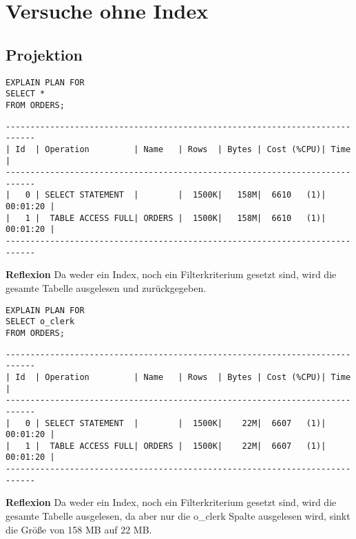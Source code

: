 \documentclass[10pt]{article}
\begin{document}
\section{Versuche ohne Index}
\subsection{Projektion}
\begin{lstlisting}[style=sql]
EXPLAIN PLAN FOR
SELECT *
FROM ORDERS;
\end{lstlisting}
\begin{lstlisting}[style=queryexecutionplan]
----------------------------------------------------------------------------
| Id  | Operation         | Name   | Rows  | Bytes | Cost (%CPU)| Time     |
----------------------------------------------------------------------------
|   0 | SELECT STATEMENT  |        |  1500K|   158M|  6610   (1)| 00:01:20 |
|   1 |  TABLE ACCESS FULL| ORDERS |  1500K|   158M|  6610   (1)| 00:01:20 |
----------------------------------------------------------------------------
\end{lstlisting}
\textbf{Reflexion} \newline
Da weder ein Index, noch ein Filterkriterium gesetzt sind, wird die gesamte Tabelle ausgelesen und zurückgegeben.
\newpage
\begin{lstlisting}[style=sql]
EXPLAIN PLAN FOR
SELECT o_clerk
FROM ORDERS;
\end{lstlisting}
\begin{lstlisting}[style=queryexecutionplan]
----------------------------------------------------------------------------
| Id  | Operation         | Name   | Rows  | Bytes | Cost (%CPU)| Time     |
----------------------------------------------------------------------------
|   0 | SELECT STATEMENT  |        |  1500K|    22M|  6607   (1)| 00:01:20 |
|   1 |  TABLE ACCESS FULL| ORDERS |  1500K|    22M|  6607   (1)| 00:01:20 |
----------------------------------------------------------------------------
\end{lstlisting}
\textbf{Reflexion} \newline
Da weder ein Index, noch ein Filterkriterium gesetzt sind, wird die gesamte Tabelle ausgelesen, da aber nur die o\_clerk Spalte ausgelesen wird, sinkt die Größe von 158 MB auf 22 MB.
\end{document}
